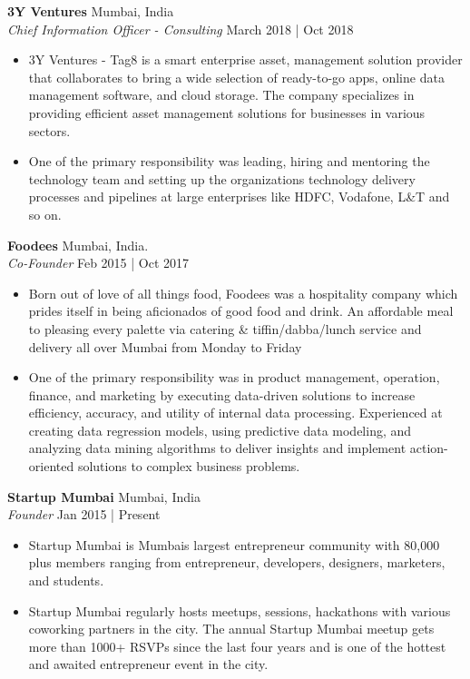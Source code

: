 \documentclass[a4paper]{article}
\begin{document}
\textbf{3Y Ventures} \hfill Mumbai, India\\
\textit{Chief Information Officer - Consulting} \hfill March 2018 | Oct 2018\\
\vspace{-1mm}
\begin{itemize} \itemsep 1pt
	\item 3Y Ventures - Tag8 is a smart enterprise asset, management solution provider that collaborates to bring a wide selection of ready-to-go apps, online data management software, and cloud storage. The company specializes in providing efficient asset management solutions for businesses in various sectors.
	\item One of the primary responsibility was leading, hiring and mentoring the technology team and setting up the organization\textquotesingle{}s technology delivery processes and pipelines at large enterprises like HDFC, Vodafone, L\&T and so on.
\end{itemize}
\textbf{Foodees} \hfill Mumbai, India.\\
\textit{Co-Founder} \hfill Feb 2015 | Oct 2017\\
\vspace{-1mm}
\begin{itemize} \itemsep 1pt
	\item Born out of love of all things food, Foodees was a hospitality company which prides itself in being aficionados of good food and drink. An affordable meal to pleasing every palette via catering \& tiffin/dabba/lunch service and delivery all over Mumbai from Monday to Friday
	\item One of the primary responsibility was in product management, operation, finance, and marketing by executing data-driven solutions to increase efficiency, accuracy, and utility of internal data processing. Experienced at creating data regression models, using predictive data modeling, and analyzing data mining algorithms to deliver insights and implement action-oriented solutions to complex business problems.
\end{itemize}
\textbf{Startup Mumbai} \hfill Mumbai, India\\
\textit{Founder} \hfill Jan 2015 | Present\\
\vspace{-1mm}
\begin{itemize} \itemsep 1pt
	\item Startup Mumbai is Mumbai\textquotesingle{}s largest entrepreneur community with 80,000 plus members ranging from entrepreneur, developers, designers, marketers, and students.
	\item Startup Mumbai regularly hosts meetups, sessions, hackathons with various coworking partners in the city. The annual Startup Mumbai meetup gets more than 1000+ RSVPs since the last four years and is one of the hottest and awaited entrepreneur event in the city.
\end{itemize}
\end{document}

